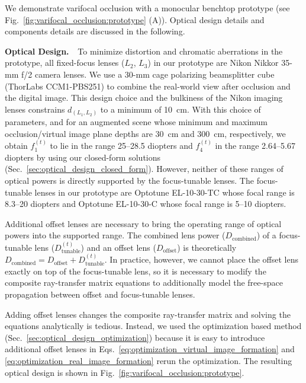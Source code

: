 
We demonstrate varifocal occlusion with a monocular benchtop prototype (see Fig.~\ref{fig:varifocal_occlusion:prototype} (A)). Optical design details and components details are discussed in the following.

{\bf Optical Design. $\,\,$} To minimize distortion and chromatic aberrations in the prototype, all fixed-focus lenses ($L_2$, $L_3$) in our prototype are Nikon Nikkor 35-mm f/2 camera lenses. We use a 30-mm cage polarizing beamsplitter cube (ThorLabs CCM1-PBS251) to combine the real-world view after occlusion and the digital image. This design choice and the bulkiness of the Nikon imaging lenses constrains $d_{(L_1,L_2)}$ to a minimum of 10~cm. With this choice of parameters, and for an augmented scene whose minimum and maximum occlusion/virtual image plane depths are 30~cm and 300~cm, respectively, we obtain $f_1^{(t)}$ to lie in the range 25--28.5 diopters and $f_4^{(t)}$ in the range 2.64--5.67 diopters by using our closed-form solutions (Sec.~\ref{sec:optical_design_closed_form}).
However, neither of these ranges of optical powers is directly supported by the focus-tunable lenses. The focus-tunable lenses in our prototype are Optotune EL-10-30-TC whose focal range is 8.3--20 diopters and Optotune EL-10-30-C whose focal range is 5--10 diopters. 

Additional offset lenses are necessary to bring the operating range of optical powers into the supported range. The combined lens power ($D_{\text{combined}}$) of a focus-tunable lens ($D_{\text{tunable}}^{(t)}$) and an offset lens ($D_{\text{offset}}$) is theoretically $D_{\text{combined}} = D_{\text{offset}} + D_{\text{tunable}}^{(t)}$. In practice, however, we cannot place the offset lens exactly on top of the focus-tunable lens, so it is necessary to modify the composite ray-transfer matrix equations to additionally model the free-space propagation between offset and focus-tunable lenses. 

Adding offset lenses changes the composite ray-transfer matrix and solving the equations analytically is tedious. Instead, we used the optimization based method (Sec.~\ref{sec:optical_design_optimization}) because it is easy to introduce additional offset lenses in Eqs.~\ref{eq:optimization_virtual_image_formation} and \ref{eq:optimization_real_image_formation} rerun the optimization. The resulting optical design is shown in Fig.~\ref{fig:varifocal_occlusion:prototype}. 




